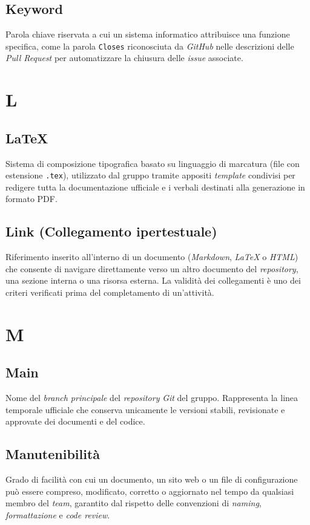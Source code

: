 \documentclass[11pt, a4paper]{article}
\begin{document}
\subsection*{Keyword}
Parola chiave riservata a cui un sistema informatico attribuisce una funzione specifica, come la parola \texttt{Closes} riconosciuta da \textit{GitHub} nelle descrizioni delle \textit{Pull Request} per automatizzare la chiusura delle \textit{issue} associate.

\newpage

\section*{L}

\subsection*{LaTeX}
Sistema di composizione tipografica basato su linguaggio di marcatura (file con estensione \texttt{.tex}), utilizzato dal gruppo tramite appositi \textit{template} condivisi per redigere tutta la documentazione ufficiale e i verbali destinati alla generazione in formato PDF.

\subsection*{Link (Collegamento ipertestuale)}
Riferimento inserito all'interno di un documento (\textit{Markdown}, \textit{LaTeX} o \textit{HTML}) che consente di navigare direttamente verso un altro documento del \textit{repository}, una sezione interna o una risorsa esterna. La validità dei collegamenti è uno dei criteri verificati prima del completamento di un'attività.

\section*{M}

\subsection*{Main}
Nome del \textit{branch principale} del \textit{repository} \textit{Git} del gruppo. Rappresenta la linea temporale ufficiale che conserva unicamente le versioni stabili, revisionate e approvate dei documenti e del codice.

\subsection*{Manutenibilità}
Grado di facilità con cui un documento, un sito web o un file di configurazione può essere compreso, modificato, corretto o aggiornato nel tempo da qualsiasi membro del \textit{team}, garantito dal rispetto delle convenzioni di \textit{naming}, \textit{formattazione} e \textit{code review}.
\end{document}
